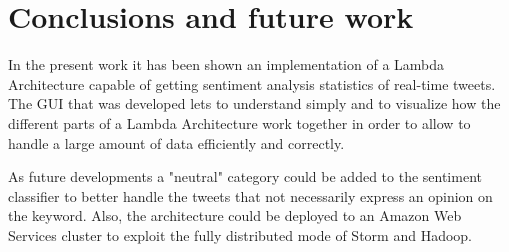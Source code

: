 \documentclass[10pt,twocolumn,letterpaper]{article}
\begin{document}
\section{Conclusions and future work}
In the present work it has been shown an implementation of a Lambda Architecture capable of getting sentiment analysis statistics of real-time tweets. The GUI that was developed lets to understand simply and to visualize how the different parts of a Lambda Architecture work together in order to allow to handle a large amount of data efficiently and correctly.

As future developments a "neutral" category could be added to the sentiment classifier to better handle the tweets that not necessarily express an opinion on the keyword. Also, the architecture could be deployed to an Amazon Web Services cluster to exploit the fully distributed mode of Storm and Hadoop.


{\small


}
\end{document}
